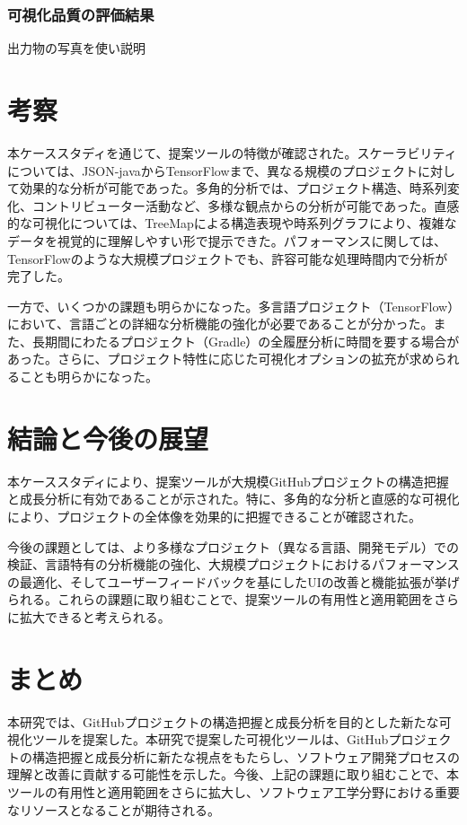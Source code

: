 \documentclass[12pt,twoside]{jbook}
\begin{document}
\subsection{可視化品質の評価結果}
出力物の写真を使い説明

\chapter{考察}
本ケーススタディを通じて、提案ツールの特徴が確認された。スケーラビリティについては、JSON-javaからTensorFlowまで、異なる規模のプロジェクトに対して効果的な分析が可能であった。多角的分析では、プロジェクト構造、時系列変化、コントリビューター活動など、多様な観点からの分析が可能であった。直感的な可視化については、TreeMapによる構造表現や時系列グラフにより、複雑なデータを視覚的に理解しやすい形で提示できた。パフォーマンスに関しては、TensorFlowのような大規模プロジェクトでも、許容可能な処理時間内で分析が完了した。

一方で、いくつかの課題も明らかになった。多言語プロジェクト（TensorFlow）において、言語ごとの詳細な分析機能の強化が必要であることが分かった。また、長期間にわたるプロジェクト（Gradle）の全履歴分析に時間を要する場合があった。さらに、プロジェクト特性に応じた可視化オプションの拡充が求められることも明らかになった。
\chapter{結論と今後の展望}
本ケーススタディにより、提案ツールが大規模GitHubプロジェクトの構造把握と成長分析に有効であることが示された。特に、多角的な分析と直感的な可視化により、プロジェクトの全体像を効果的に把握できることが確認された。

今後の課題としては、より多様なプロジェクト（異なる言語、開発モデル）での検証、言語特有の分析機能の強化、大規模プロジェクトにおけるパフォーマンスの最適化、そしてユーザーフィードバックを基にしたUIの改善と機能拡張が挙げられる。これらの課題に取り組むことで、提案ツールの有用性と適用範囲をさらに拡大できると考えられる。
\chapter{まとめ}
本研究では、GitHubプロジェクトの構造把握と成長分析を目的とした新たな可視化ツールを提案した。本研究で提案した可視化ツールは、GitHubプロジェクトの構造把握と成長分析に新たな視点をもたらし、ソフトウェア開発プロセスの理解と改善に貢献する可能性を示した。今後、上記の課題に取り組むことで、本ツールの有用性と適用範囲をさらに拡大し、ソフトウェア工学分野における重要なリソースとなることが期待される。



%
%




\appendix
\end{document}
